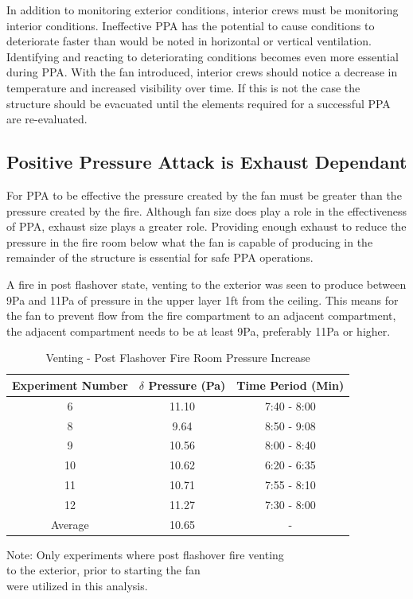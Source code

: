 \documentclass{article}
\begin{document}
In addition to monitoring exterior conditions, interior crews must be monitoring interior conditions. Ineffective PPA has the potential to cause conditions to deteriorate faster than would be noted in horizontal or vertical ventilation. Identifying and reacting to deteriorating conditions becomes even more essential during PPA. With the fan introduced, interior crews should notice a decrease in temperature and increased visibility over time. If this is not the case the structure should be evacuated until the elements required for a successful PPA are re-evaluated.

\subsection{Positive Pressure Attack is Exhaust Dependant} \label{sec:ExhaustDepend}
For PPA to be effective the pressure created by the fan must be greater than the pressure created by the fire. Although fan size does play a role in the effectiveness of PPA, exhaust size plays a greater role. Providing enough exhaust to reduce the pressure in the fire room below what the fan is capable of producing in the remainder of the structure is essential for safe PPA operations.

A fire in post flashover state, venting to the exterior was seen to produce between 9Pa and 11Pa of pressure in the upper layer 1ft from the ceiling. This means for the fan to prevent flow from the fire compartment to an adjacent compartment, the adjacent compartment needs to be at least 9Pa, preferably 11Pa or higher. 

\begin{table} [H]
	\centering
	\caption{Venting - Post Flashover Fire Room Pressure Increase}
	\centering
	
	\begin{tabular}{|c|c|c|}
		\hline
		Experiment Number & $\delta$ Pressure (Pa) & Time Period (Min) \\ \hline \hline
		6 & 11.10 & 7:40 - 8:00 \\ \hline
		8 & 9.64 & 8:50 - 9:08 \\ \hline
		9 & 10.56 & 8:00 - 8:40 \\ \hline
		10 & 10.62 & 6:20 - 6:35 \\ \hline
		11 & 10.71 & 7:55 - 8:10 \\ \hline
		12 & 11.27 & 7:30 - 8:00 \\ \hline
		Average & 10.65 & -  \\ \hline
	\end{tabular}
	
	\begin{tablenotes}
		\centering
		\item Note: Only experiments where post flashover fire venting \\ to the exterior, prior to starting the fan \\ were utilized in this analysis.
	\end{tablenotes}
	\label{tab:FireRoomPressure}
\end{table}
\end{document}
